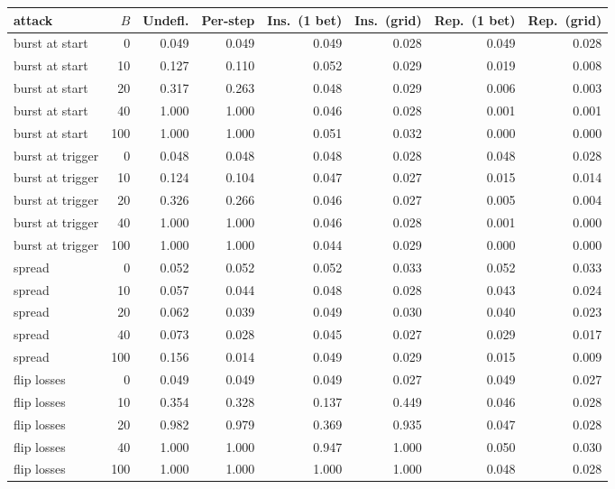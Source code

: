 \begin{tabular}{lrrrrrrr}
\toprule
attack & $B$ & Undefl. & Per-step & Ins.\ (1 bet) & Ins.\ (grid) & Rep.\ (1 bet) & Rep.\ (grid) \\
\midrule
burst at start & 0 & 0.049 & 0.049 & 0.049 & 0.028 & 0.049 & 0.028 \\
burst at start & 10 & 0.127 & 0.110 & 0.052 & 0.029 & 0.019 & 0.008 \\
burst at start & 20 & 0.317 & 0.263 & 0.048 & 0.029 & 0.006 & 0.003 \\
burst at start & 40 & 1.000 & 1.000 & 0.046 & 0.028 & 0.001 & 0.001 \\
burst at start & 100 & 1.000 & 1.000 & 0.051 & 0.032 & 0.000 & 0.000 \\
\midrule
burst at trigger & 0 & 0.048 & 0.048 & 0.048 & 0.028 & 0.048 & 0.028 \\
burst at trigger & 10 & 0.124 & 0.104 & 0.047 & 0.027 & 0.015 & 0.014 \\
burst at trigger & 20 & 0.326 & 0.266 & 0.046 & 0.027 & 0.005 & 0.004 \\
burst at trigger & 40 & 1.000 & 1.000 & 0.046 & 0.028 & 0.001 & 0.000 \\
burst at trigger & 100 & 1.000 & 1.000 & 0.044 & 0.029 & 0.000 & 0.000 \\
\midrule
spread & 0 & 0.052 & 0.052 & 0.052 & 0.033 & 0.052 & 0.033 \\
spread & 10 & 0.057 & 0.044 & 0.048 & 0.028 & 0.043 & 0.024 \\
spread & 20 & 0.062 & 0.039 & 0.049 & 0.030 & 0.040 & 0.023 \\
spread & 40 & 0.073 & 0.028 & 0.045 & 0.027 & 0.029 & 0.017 \\
spread & 100 & 0.156 & 0.014 & 0.049 & 0.029 & 0.015 & 0.009 \\
\midrule
flip losses & 0 & 0.049 & 0.049 & 0.049 & 0.027 & 0.049 & 0.027 \\
flip losses & 10 & 0.354 & 0.328 & 0.137 & 0.449 & 0.046 & 0.028 \\
flip losses & 20 & 0.982 & 0.979 & 0.369 & 0.935 & 0.047 & 0.028 \\
flip losses & 40 & 1.000 & 1.000 & 0.947 & 1.000 & 0.050 & 0.030 \\
flip losses & 100 & 1.000 & 1.000 & 1.000 & 1.000 & 0.048 & 0.028 \\

\bottomrule
\end{tabular}